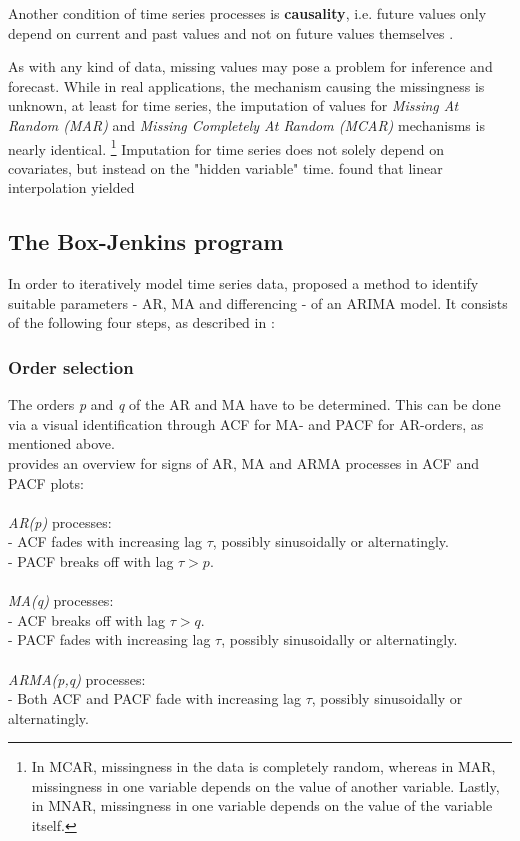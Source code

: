 \documentclass[a4paper, 11pt]{article}
\begin{document}
Another condition of time series processes is \textbf{causality}, i.e. future values only depend on current and past values and not on future values themselves \citep{Vogel.2015}.

As with any kind of data, missing values may pose a problem for inference and forecast. While in real applications, the mechanism causing the missingness is unknown, at least for time series, the imputation of values for \textit{Missing At Random (MAR)} and \textit{Missing Completely At Random (MCAR)} mechanisms is nearly identical. \footnote{In MCAR, missingness in the data is completely random, whereas in MAR, missingness in one variable depends on the value of another variable. Lastly, in MNAR, missingness in one variable depends on the value of the variable itself.} Imputation for time series does not solely depend on covariates, but instead on the "hidden variable" time. \cite{Moritz2015ComparisonOD} found that linear interpolation yielded 

\subsection{The Box-Jenkins program}
In order to iteratively model time series data, \citep{Box.1976} proposed a method to identify suitable parameters - AR, MA and differencing - of an ARIMA model. It consists of the following four steps, as described in \cite{Falk.2012}: \\
\subsubsection{Order selection}
The orders \textit{p} and \textit{q} of the AR and MA have to be determined. This can be done via a visual identification through ACF for MA- and PACF for AR-orders, as mentioned above. \\
\cite{Vogel.2015} provides an overview for signs of AR, MA and ARMA processes in ACF and PACF plots: \\
\\
\textit{AR(p)} processes:\\
- ACF fades with increasing lag $\tau$, possibly sinusoidally or alternatingly.\\
- PACF breaks off with lag $\tau > p$.\\
\\
\textit{MA(q)} processes:\\
- ACF breaks off with lag $\tau > q$.\\
- PACF fades with increasing lag $\tau$, possibly sinusoidally or alternatingly.\\
\\
\textit{ARMA(p,q)} processes: \\
- Both ACF and PACF fade with increasing lag $\tau$, possibly sinusoidally or alternatingly.\\
\end{document}

